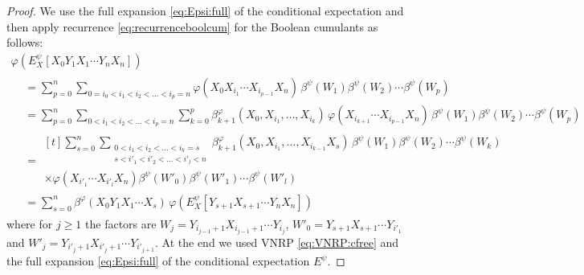 \documentclass[12pt]{amsart}
\newcommand{\IE}{E}
\def\E{E}
\theoremstyle{definition}
\numberwithin{equation}{section}
\begin{document}
\begin{proof}
  We use the full expansion   \eqref{eq:Epsi:full} of the conditional expectation and then apply recurrence \eqref{eq:recurrenceboolcum} for the Boolean cumulants as follows:
  \begin{multline*}
    \varphi(\IE_X^\psi[X_0Y_1X_1\dotsm Y_nX_n])\\
    \begin{aligned}
      &= \sum_{p=0}^{n}\sum_{0=i_0 < i_1<i_2<\dots< i_p=n}
      \varphi( X_{0}X_{i_1}\dotsm X_{i_{p-1}}X_n)\,
      \beta^\psi(W_1)\beta^\psi(W_2)\dotsm\beta^\psi(W_p)
      \\
      &= \sum_{p=0}^{n}    \sum_{0 < i_1<i_2<\dots< i_p= n}
      \sum_{k=0}^p \beta^\varphi_{k+1}(X_0,X_{i_1},\dots,X_{i_k})\,
      \varphi( 
      X_{i_{k+1}}\dotsm X_{i_{p-1}}X_n)\,
      \beta^\psi(W_1)\beta^\psi(W_2)\dotsm\beta^\psi(W_p)
      \\
      &=
      \begin{multlined}[t]
        \sum_{s=0}^{n}
        \sum_{\substack{0 < i_1<i_2<\dots< i_k=s\\
            s < i'_1<i'_2<\dots< i'_l<n}
        }
        \beta^\varphi_{k+1}(X_0,X_{i_1},\dots,X_{i_{k-1}}X_s)\,
        \beta^\psi(W_1)\beta^\psi(W_2)\dotsm    \beta^\psi(W_k)
        \\
        \times
        \varphi(X_{i'_1}\dotsm X_{i'_l}X_n)
        \beta^\psi(W'_0)\beta^\psi(W'_1)\dotsm    \beta^\psi(W'_l)
      \end{multlined}
      \\
      &= \sum_{s=0}^{n} \beta^\varphi(X_0Y_1X_1\dotsm X_s)\,
      \varphi(\E_X^\psi[Y_{s+1}X_{s+1}\dotsm Y_nX_n])
    \end{aligned}
  \end{multline*}
  where
  for $j\geq1$ the factors are
  $W_j=Y_{i_{j-1}+1}X_{i_{j-1}+1}\dotsm Y_{i_j}$,
  $W'_0=Y_{s+1}X_{s+1}\dotsm Y_{i'_1}$ and
  $W'_j=Y_{i'_{j}+1}X_{i'_{j}+1}\dotsm Y_{i'_{j+1}}$.
  At the end  we used
  VNRP \eqref{eq:VNRP:cfree} and 
  the full expansion   \eqref{eq:Epsi:full} of
  the conditional expectation $E^\psi$.
\end{proof}
				
\end{document}
